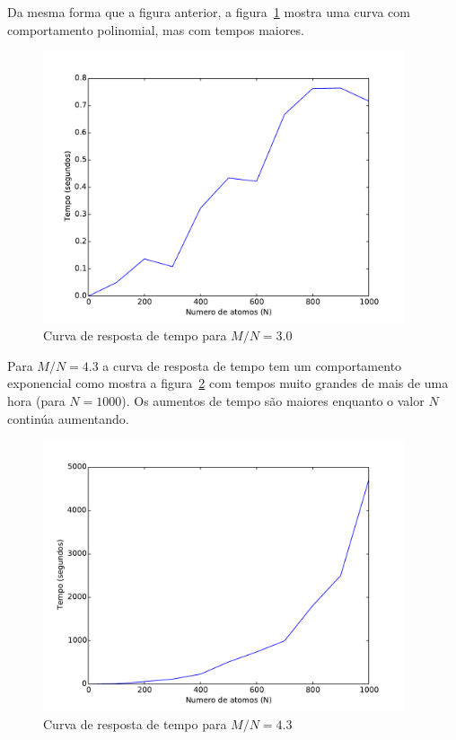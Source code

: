 		Da mesma forma que a figura anterior, a figura~\ref{fig:max3satmn30} mostra uma curva com comportamento polinomial, mas com tempos maiores.
		\begin{figure}[H]
			\centering
			\includegraphics[height=8cm]{images/max3sat_mn30}
			\caption{Curva de resposta de tempo para $M/N=3.0$}
			\label{fig:max3satmn30}
		\end{figure}
		
		Para $M/N=4.3$ a curva de resposta de tempo tem um comportamento exponencial como mostra a figura~\ref{fig:max3satmn43} com tempos muito grandes de mais de uma hora (para $N=1000$). Os aumentos de tempo são maiores enquanto o valor $N$ continúa aumentando.
		\begin{figure}[H]
			\centering
			\includegraphics[height=8cm]{images/max3sat_mn43}
			\caption{Curva de resposta de tempo para $M/N=4.3$}
			\label{fig:max3satmn43}
		\end{figure}
		
